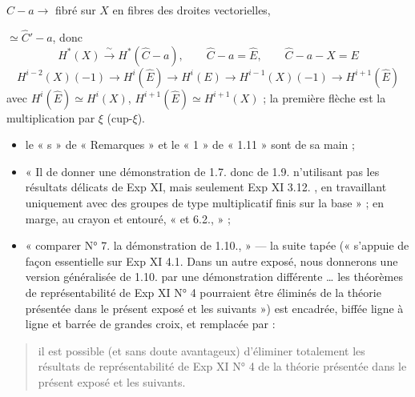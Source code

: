 \documentclass[11pt,a4paper]{article}
\begin{document}
 $\widehat{C} - a \to$ fibré sur $X$ en fibres des droites
 vectorielles,

$\simeq \widehat{C}' - a$, donc
\[
  \boxed{H^{*}(X) \xrightarrow{\ \sim\ } H^{*}(\widehat{C} - a)}, \qquad
  \widehat{C} - a = \widehat{E}, \qquad \widehat{C} - a - X = E
\]
\[
  H^{i-2}(X)(-1) \to H^i(\widehat{E}) \to \boxed{H^i(E)} \to H^{i-1}(X)(-1)
  \to H^{i+1}(\widehat{E})
\]
avec $H^i(\widehat{E}) \simeq H^i(X)$, $H^{i+1}(\widehat{E}) \simeq H^{i+1}(X)$ ;
la première flèche est la multiplication par $\xi$ (cup-$\xi$).



\begin{itemize}
  \item le « s » de « Remarques » et le « 1 » de « 1.11 » sont de sa main ;
  \item « Il   de donner une
  démonstration de 1.7. donc de 1.9. n'utilisant pas les résultats délicats de
  Exp XI, mais seulement  \struck{\ill{}} Exp XI
  3.12. , en travaillant uniquement avec des groupes de type
  multiplicatif finis sur la base » ; en marge, au crayon et entouré,
  « et 6.2., » ;
  \item « comparer  N° 7.   la démonstration de 1.10., » — la suite tapée (« s'appuie de façon
  essentielle sur Exp XI 4.1. Dans un autre exposé, nous donnerons une version
  généralisée de 1.10. par une démonstration différente … les théorèmes de
  représentabilité de Exp XI N° 4 pourraient être éliminés de la théorie
  présentée dans le présent exposé et les suivants ») est encadrée, biffée
  ligne à ligne et barrée de grandes croix, et remplacée par :
\end{itemize}

\begin{quote}
 il est possible (et sans doute avantageux) d'éliminer
totalement les résultats de représentabilité de Exp XI N° 4 de la théorie
présentée dans le présent exposé et les suivants.
\end{quote}
\end{document}
